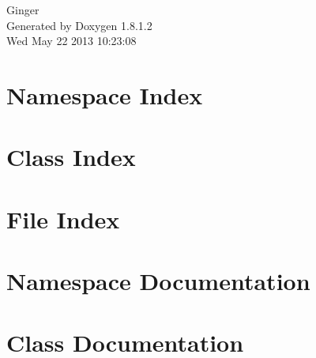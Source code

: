 \documentclass{book}
\begin{document}
\hypersetup{pageanchor=false,citecolor=blue}
\begin{titlepage}
\vspace*{7cm}
\begin{center}
{\Large Ginger }\\
\vspace*{1cm}
{\large Generated by Doxygen 1.8.1.2}\\
\vspace*{0.5cm}
{\small Wed May 22 2013 10:23:08}\\
\end{center}
\end{titlepage}
\clearemptydoublepage
{}
\tableofcontents
\clearemptydoublepage
{}
\hypersetup{pageanchor=true,citecolor=blue}
\chapter{Namespace Index}

\chapter{Class Index}

\chapter{File Index}

\chapter{Namespace Documentation}

\chapter{Class Documentation}





\end{document}
